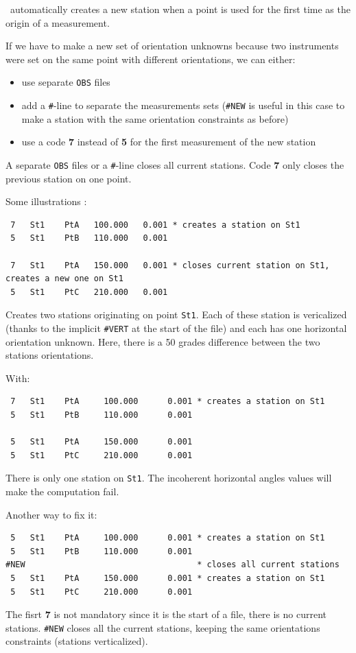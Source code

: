 \CdPPP\ automatically creates a new station when a point is used for the first time as the origin of a measurement.

If we have to make a new set of orientation unknowns because two instruments were set on the same point with different
orientations, we can either:

\begin{itemize}
   \item use separate \texttt{OBS} files
   \item add a \texttt{\#}-line to separate the measurements sets (\texttt{\#NEW} is useful in this case to make a station with the same orientation constraints as before)
   \item use a code \textbf{7} instead of \textbf{5} for the first measurement of the new station
\end{itemize}

A separate \texttt{OBS} files or a \texttt{\#}-line closes all current stations.
Code \textbf{7} only closes the previous station on one point. 

Some illustrations :
\begin{verbatim}
 7   St1    PtA   100.000   0.001 * creates a station on St1
 5   St1    PtB   110.000   0.001

 7   St1    PtA   150.000   0.001 * closes current station on St1, creates a new one on St1
 5   St1    PtC   210.000   0.001
\end{verbatim}
Creates two stations originating on point \texttt{St1}. Each of these station
is vericalized (thanks to the implicit \texttt{\#VERT} at the start of the file) and each has one horizontal orientation unknown.
Here, there is a 50 grades difference between the two stations orientations.

With:
\begin{verbatim}
 7   St1    PtA     100.000      0.001 * creates a station on St1
 5   St1    PtB     110.000      0.001

 5   St1    PtA     150.000      0.001
 5   St1    PtC     210.000      0.001
\end{verbatim}
There is only one station on \texttt{St1}. The incoherent horizontal angles values
will make the computation fail.

Another way to fix it:
\begin{verbatim}
 5   St1    PtA     100.000      0.001 * creates a station on St1
 5   St1    PtB     110.000      0.001
#NEW                                   * closes all current stations
 5   St1    PtA     150.000      0.001 * creates a station on St1
 5   St1    PtC     210.000      0.001
\end{verbatim}
The fisrt \textbf{7} is not mandatory since it is the start of a file, there is no
current stations. \texttt{\#NEW} closes all the current stations, keeping the same orientations constraints (stations verticalized).

